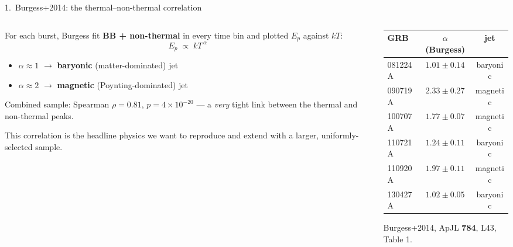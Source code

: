 \documentclass[aspectratio=169,11pt]{beamer}
\begin{document}
\begin{frame}{1.\ Burgess+2014: the thermal--non-thermal correlation}
\begin{columns}
\begin{column}{0.5\textwidth}
\small
For each burst, Burgess fit \textbf{BB + non-thermal} in every time bin and
plotted $E_p$ against $kT$:
\[
  E_p \;\propto\; kT^{\,\alpha}
\]
\begin{itemize}
  \item $\alpha \approx 1$ $\rightarrow$ \textbf{baryonic} (matter-dominated) jet
  \item $\alpha \approx 2$ $\rightarrow$ \textbf{magnetic} (Poynting-dominated) jet
\end{itemize}
Combined sample: Spearman $\rho = 0.81$, $p = 4\times10^{-20}$ ---
a \emph{very} tight link between the thermal and non-thermal peaks.
\medskip

This correlation is the headline physics we want to reproduce and extend with a
larger, uniformly-selected sample.
\end{column}
\begin{column}{0.5\textwidth}
\centering
\renewcommand{\arraystretch}{1.15}
\footnotesize
\begin{tabular}{lcc}
\toprule
GRB & $\alpha$ (Burgess) & jet \\
\midrule
081224A & $1.01\pm0.14$ & baryonic \\
090719A & $2.33\pm0.27$ & magnetic \\
100707A & $1.77\pm0.07$ & magnetic \\
110721A & $1.24\pm0.11$ & baryonic \\
110920A & $1.97\pm0.11$ & magnetic \\
130427A & $1.02\pm0.05$ & baryonic \\
\bottomrule
\end{tabular}
\vspace{0.8em}

\scriptsize Burgess+2014, ApJL \textbf{784}, L43, Table 1.
\end{column}
\end{columns}
\end{frame}
\end{document}
